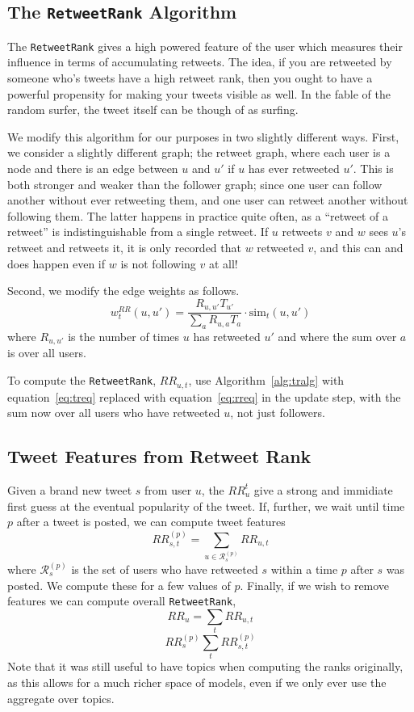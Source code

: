 \subsection{The \texttt{RetweetRank} Algorithm}

The \texttt{RetweetRank} gives a high powered feature of the user which measures their influence in terms of accumulating retweets.  
The idea, if you are retweeted by someone who's tweets have a high retweet rank, then you ought to have a powerful propensity for making your tweets visible as well.
In the fable of the random surfer, the tweet itself can be though of as surfing.  

We modify this algorithm for our purposes in two slightly different ways.
First, we consider a slightly different graph; the retweet graph, where each user is a node and there is an edge between $u$ and $u'$ if $u$ has ever retweeted $u'$.
This is both stronger and weaker than the follower graph; since one user can follow another without ever retweeting them, and one user can retweet another without following them.
The latter happens in practice quite often, as a ``retweet of a retweet'' is indistinguishable from a single retweet.
If $u$ retweets $v$ and $w$ sees $u$'s retweet and retweets it, it is only recorded that $w$ retweeted $v$, and this can and does happen even if $w$ is not following $v$ at all!

Second, we modify the edge weights as follows.
\begin{equation}\label{eq:rreq}
w^{RR}_t(u,u') = \frac{R_{u,u'}T_{u'}}{\sum_a R_{u,a}T_{a}}\cdot \mbox{sim}_t(u,u')
\end{equation}
where $R_{u,u'}$ is the number of times $u$ has retweeted $u'$ and where the sum over $a$ is over all users.  

To compute the \texttt{RetweetRank}, $RR_{u,t}$, use Algorithm~\ref{alg:tralg} with equation~\eqref{eq:treq} replaced with equation~\eqref{eq:rreq} in the update step, with the sum now over all users who have retweeted $u$, not just followers.  

\subsection{Tweet Features from Retweet Rank}

Given a brand new tweet $s$ from user $u$, the $RR_u^t$ give a strong and immidiate first guess at the eventual popularity of the tweet.  If, further, we wait until time $p$ after a tweet is posted, we can compute tweet features
\[RR_{s,t}^{(p)} = \sum_{u\in\mathcal{R}_s^{(p)}}RR_{u,t}\]
where $\mathcal{R}_s^{(p)}$ is the set of users who have retweeted $s$ within a time $p$ after $s$ was posted.  
We compute these for a few values of $p$.
Finally, if we wish to remove features we can compute overall \texttt{RetweetRank},
\[RR_{u} =\sum_t RR_{u,t}\]
\[RR_{s}^{(p)} \sum_t RR_{s,t}^{(p)}\]
Note that it was still useful to have topics when computing the ranks originally, as this allows for a much richer space of models, even if we only ever use the aggregate over topics.    

